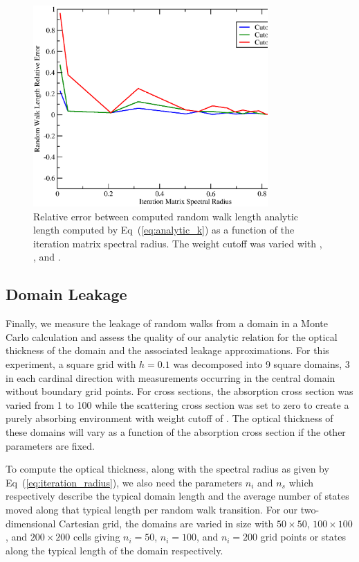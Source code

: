 \documentclass[preprint,11pt]{elsarticle}
\begin{document}
\begin{figure}[ht!]
  \begin{center}
    \includegraphics[width=0.8\textwidth]{random_walk_error.eps}
  \end{center}
  \caption{Relative error between computed random walk length analytic length
    computed by Eq~(\ref{eq:analytic_k}) as a function of the iteration matrix
    spectral radius. The weight cutoff was varied with , ,
    and .}
  \label{fig:measured_length_error}
\end{figure}

\subsection{Domain Leakage}
\label{subsec:domain_leakage}

Finally, we measure the leakage of random walks from a domain in a Monte Carlo
calculation and assess the quality of our analytic relation for the optical
thickness of the domain and the associated leakage approximations. For this
experiment, a square grid with $h=0.1$ was decomposed into 9 square domains, 3
in each cardinal direction with measurements occurring in the central domain
without boundary grid points. For cross sections, the absorption cross section
was varied from 1 to 100 while the scattering cross section was set to zero to
create a purely absorbing environment with weight cutoff of . The
optical thickness of these domains will vary as a function of the absorption
cross section if the other parameters are fixed.

To compute the optical thickness, along with the spectral radius as given by
Eq~(\ref{eq:iteration_radius}), we also need the parameters $n_i$ and $n_s$
which respectively describe the typical domain length and the average number
of states moved along that typical length per random walk transition. For our
two-dimensional Cartesian grid, the domains are varied in size with $50 \times
50$, $100 \times 100$, and $200 \times 200$ cells giving $n_i=50$, $n_i=100$,
and $n_i=200$ grid points or states along the typical length of the domain
respectively.
\end{document}
